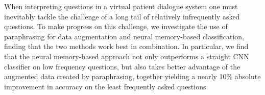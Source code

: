 When interpreting questions in a virtual patient dialogue system one must inevitably tackle the challenge of a long tail of relatively infrequently asked questions.  To make progress on this challenge, we investigate the use of paraphrasing for data augmentation and neural memory-based classification, finding that the two methods work best in combination. In particular, we find that the neural memory-based approach not only outperforms a straight CNN classifier on low frequency questions, but also takes better advantage of the augmented data created by paraphrasing, together yielding a nearly 10\% absolute improvement in accuracy on the least frequently asked questions.
